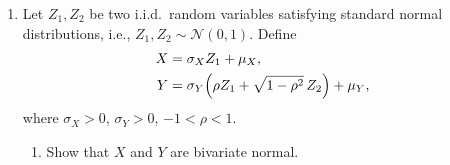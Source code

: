 \documentclass[11pt]{article}
\newcommand{\Expo}{\operatorname{Expo}}
\begin{document}
\begin{enumerate}[label=\arabic*., leftmargin=1.6em]
\textbf{Solution.}
Take \(\Expo(\lambda)\) to have density \(\lambda e^{-\lambda x}\) for \(x>0\). For \(c>0\),
\begin{align*}
\int_{c}^{\infty} x\lambda e^{-\lambda x}\,dx
&= \bigl[-xe^{-\lambda x}\bigr]_{c}^{\infty}+\int_{c}^{\infty}e^{-\lambda x}\,dx \\
&= ce^{-\lambda c}+\frac{1}{\lambda}e^{-\lambda c}.
\end{align*}
Since \(P(X_{1}>c)=e^{-\lambda_{1}c}\),
\begin{align*}
E(X_{1}\mid X_{1}>2026)
&= \frac{2026e^{-\lambda_{1}\cdot 2026}+\lambda_{1}^{-1}e^{-\lambda_{1}\cdot 2026}}{e^{-\lambda_{1}\cdot 2026}} \\
&= 2026+\frac{1}{\lambda_{1}}.
\end{align*}
Likewise,
\begin{align*}
\int_{0}^{2026} x\lambda_{1}e^{-\lambda_{1}x}\,dx
&= \bigl[-xe^{-\lambda_{1}x}\bigr]_{0}^{2026}+\int_{0}^{2026}e^{-\lambda_{1}x}\,dx \\
&= -2026e^{-\lambda_{1}\cdot 2026}+\frac{1-e^{-\lambda_{1}\cdot 2026}}{\lambda_{1}}.
\end{align*}
With \(P(X_{1}<2026)=1-e^{-\lambda_{1}\cdot 2026}\),
\begin{align*}
E(X_{1}\mid X_{1}<2026)
&= \frac{1}{\lambda_{1}}-\frac{2026e^{-\lambda_{1}\cdot 2026}}{1-e^{-\lambda_{1}\cdot 2026}} \\
&= \frac{1}{\lambda_{1}}-\frac{2026}{e^{\lambda_{1}\cdot 2026}-1}.
\end{align*}
Independence gives
\(E(X_{i}\mid X_{1}>1997,\,X_{2}>2014,\,X_{3}>2026)=E(X_{i}\mid X_{i}>c_{i})\),
where \(c_{1}=1997\), \(c_{2}=2014\), \(c_{3}=2026\). Therefore
\begin{align*}
&E(X_{1}+X_{2}+X_{3}\mid X_{1}>1997,\,X_{2}>2014,\,X_{3}>2026) \\
&\qquad= \Bigl(1997+\frac{1}{\lambda_{1}}\Bigr)+\Bigl(2014+\frac{1}{\lambda_{2}}\Bigr)+\Bigl(2026+\frac{1}{\lambda_{3}}\Bigr) \\
&\qquad= 6037+\frac{1}{\lambda_{1}}+\frac{1}{\lambda_{2}}+\frac{1}{\lambda_{3}}.
\end{align*}

\newpage
\item Let $Z_{1},Z_{2}$ be two i.i.d.\ random variables satisfying standard normal distributions, i.e.,
$Z_{1},Z_{2}\sim\mathcal{N}(0,1)$. Define
\begin{align*}
X &= \sigma_{X} Z_{1} + \mu_{X}, \\
Y &= \sigma_{Y}\Bigl(\rho Z_{1} + \sqrt{1-\rho^{2}}\, Z_{2}\Bigr) + \mu_{Y},
\end{align*}
where $\sigma_{X}>0$, $\sigma_{Y}>0$, $-1<\rho<1$.
\begin{enumerate}
\item Show that $X$ and $Y$ are bivariate normal.


\end{enumerate}
\end{enumerate}
\end{document}
